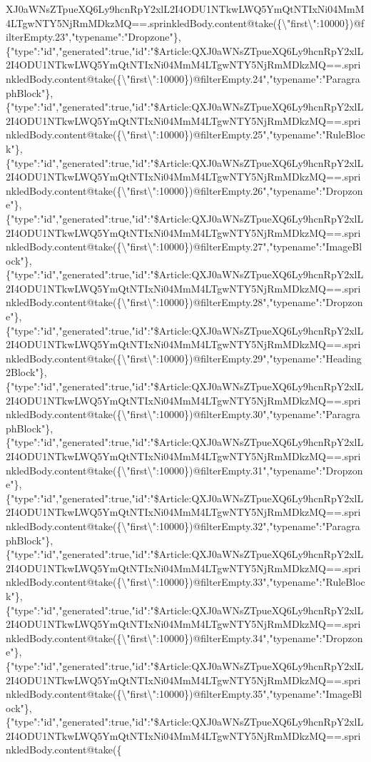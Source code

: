XJ0aWNsZTpueXQ6Ly9hcnRpY2xlL2I4ODU1NTkwLWQ5YmQtNTIxNi04MmM4LTgwNTY5NjRmMDkzMQ==.sprinkledBody.content@take(\{\textbackslash{}"first\textbackslash{}":10000\})@filterEmpty.23","typename":"Dropzone"\},\{"type":"id","generated":true,"id":"\$Article:QXJ0aWNsZTpueXQ6Ly9hcnRpY2xlL2I4ODU1NTkwLWQ5YmQtNTIxNi04MmM4LTgwNTY5NjRmMDkzMQ==.sprinkledBody.content@take(\{\textbackslash{}"first\textbackslash{}":10000\})@filterEmpty.24","typename":"ParagraphBlock"\},\{"type":"id","generated":true,"id":"\$Article:QXJ0aWNsZTpueXQ6Ly9hcnRpY2xlL2I4ODU1NTkwLWQ5YmQtNTIxNi04MmM4LTgwNTY5NjRmMDkzMQ==.sprinkledBody.content@take(\{\textbackslash{}"first\textbackslash{}":10000\})@filterEmpty.25","typename":"RuleBlock"\},\{"type":"id","generated":true,"id":"\$Article:QXJ0aWNsZTpueXQ6Ly9hcnRpY2xlL2I4ODU1NTkwLWQ5YmQtNTIxNi04MmM4LTgwNTY5NjRmMDkzMQ==.sprinkledBody.content@take(\{\textbackslash{}"first\textbackslash{}":10000\})@filterEmpty.26","typename":"Dropzone"\},\{"type":"id","generated":true,"id":"\$Article:QXJ0aWNsZTpueXQ6Ly9hcnRpY2xlL2I4ODU1NTkwLWQ5YmQtNTIxNi04MmM4LTgwNTY5NjRmMDkzMQ==.sprinkledBody.content@take(\{\textbackslash{}"first\textbackslash{}":10000\})@filterEmpty.27","typename":"ImageBlock"\},\{"type":"id","generated":true,"id":"\$Article:QXJ0aWNsZTpueXQ6Ly9hcnRpY2xlL2I4ODU1NTkwLWQ5YmQtNTIxNi04MmM4LTgwNTY5NjRmMDkzMQ==.sprinkledBody.content@take(\{\textbackslash{}"first\textbackslash{}":10000\})@filterEmpty.28","typename":"Dropzone"\},\{"type":"id","generated":true,"id":"\$Article:QXJ0aWNsZTpueXQ6Ly9hcnRpY2xlL2I4ODU1NTkwLWQ5YmQtNTIxNi04MmM4LTgwNTY5NjRmMDkzMQ==.sprinkledBody.content@take(\{\textbackslash{}"first\textbackslash{}":10000\})@filterEmpty.29","typename":"Heading2Block"\},\{"type":"id","generated":true,"id":"\$Article:QXJ0aWNsZTpueXQ6Ly9hcnRpY2xlL2I4ODU1NTkwLWQ5YmQtNTIxNi04MmM4LTgwNTY5NjRmMDkzMQ==.sprinkledBody.content@take(\{\textbackslash{}"first\textbackslash{}":10000\})@filterEmpty.30","typename":"ParagraphBlock"\},\{"type":"id","generated":true,"id":"\$Article:QXJ0aWNsZTpueXQ6Ly9hcnRpY2xlL2I4ODU1NTkwLWQ5YmQtNTIxNi04MmM4LTgwNTY5NjRmMDkzMQ==.sprinkledBody.content@take(\{\textbackslash{}"first\textbackslash{}":10000\})@filterEmpty.31","typename":"Dropzone"\},\{"type":"id","generated":true,"id":"\$Article:QXJ0aWNsZTpueXQ6Ly9hcnRpY2xlL2I4ODU1NTkwLWQ5YmQtNTIxNi04MmM4LTgwNTY5NjRmMDkzMQ==.sprinkledBody.content@take(\{\textbackslash{}"first\textbackslash{}":10000\})@filterEmpty.32","typename":"ParagraphBlock"\},\{"type":"id","generated":true,"id":"\$Article:QXJ0aWNsZTpueXQ6Ly9hcnRpY2xlL2I4ODU1NTkwLWQ5YmQtNTIxNi04MmM4LTgwNTY5NjRmMDkzMQ==.sprinkledBody.content@take(\{\textbackslash{}"first\textbackslash{}":10000\})@filterEmpty.33","typename":"RuleBlock"\},\{"type":"id","generated":true,"id":"\$Article:QXJ0aWNsZTpueXQ6Ly9hcnRpY2xlL2I4ODU1NTkwLWQ5YmQtNTIxNi04MmM4LTgwNTY5NjRmMDkzMQ==.sprinkledBody.content@take(\{\textbackslash{}"first\textbackslash{}":10000\})@filterEmpty.34","typename":"Dropzone"\},\{"type":"id","generated":true,"id":"\$Article:QXJ0aWNsZTpueXQ6Ly9hcnRpY2xlL2I4ODU1NTkwLWQ5YmQtNTIxNi04MmM4LTgwNTY5NjRmMDkzMQ==.sprinkledBody.content@take(\{\textbackslash{}"first\textbackslash{}":10000\})@filterEmpty.35","typename":"ImageBlock"\},\{"type":"id","generated":true,"id":"\$Article:QXJ0aWNsZTpueXQ6Ly9hcnRpY2xlL2I4ODU1NTkwLWQ5YmQtNTIxNi04MmM4LTgwNTY5NjRmMDkzMQ==.sprinkledBody.content@take(\{